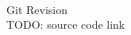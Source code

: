 \thispagestyle{empty}
\vspace*{\fill}
\GITAuthorDate \\
Git Revision
\ifx\GITTags\empty
\GITAbrHash
\else
\GITAbrHash\ \GITTags
\fi
\\
TODO: source code link
